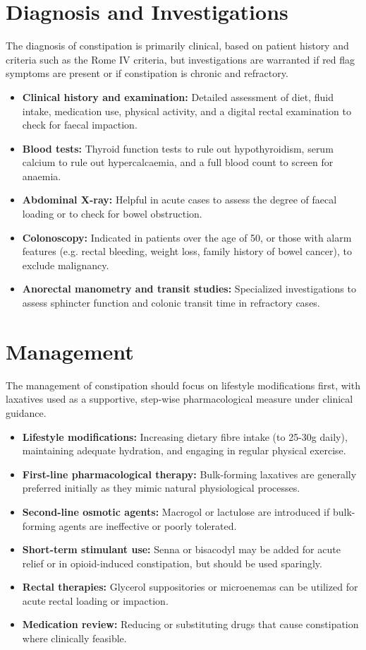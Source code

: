 \section*{Diagnosis and Investigations}
The diagnosis of constipation is primarily clinical, based on patient history and criteria such as the Rome IV criteria, but investigations are warranted if red flag symptoms are present or if constipation is chronic and refractory.
\begin{itemize}
    \item \textbf{Clinical history and examination:} Detailed assessment of diet, fluid intake, medication use, physical activity, and a digital rectal examination to check for faecal impaction.
    \item \textbf{Blood tests:} Thyroid function tests to rule out hypothyroidism, serum calcium to rule out hypercalcaemia, and a full blood count to screen for anaemia.
    \item \textbf{Abdominal X-ray:} Helpful in acute cases to assess the degree of faecal loading or to check for bowel obstruction.
    \item \textbf{Colonoscopy:} Indicated in patients over the age of 50, or those with alarm features (e.g. rectal bleeding, weight loss, family history of bowel cancer), to exclude malignancy.
    \item \textbf{Anorectal manometry and transit studies:} Specialized investigations to assess sphincter function and colonic transit time in refractory cases.
\end{itemize}

\section*{Management}
The management of constipation should focus on lifestyle modifications first, with laxatives used as a supportive, step-wise pharmacological measure under clinical guidance.
\begin{itemize}
    \item \textbf{Lifestyle modifications:} Increasing dietary fibre intake (to 25-30g daily), maintaining adequate hydration, and engaging in regular physical exercise.
    \item \textbf{First-line pharmacological therapy:} Bulk-forming laxatives are generally preferred initially as they mimic natural physiological processes.
    \item \textbf{Second-line osmotic agents:} Macrogol or lactulose are introduced if bulk-forming agents are ineffective or poorly tolerated.
    \item \textbf{Short-term stimulant use:} Senna or bisacodyl may be added for acute relief or in opioid-induced constipation, but should be used sparingly.
    \item \textbf{Rectal therapies:} Glycerol suppositories or microenemas can be utilized for acute rectal loading or impaction.
    \item \textbf{Medication review:} Reducing or substituting drugs that cause constipation where clinically feasible.
\end{itemize}

